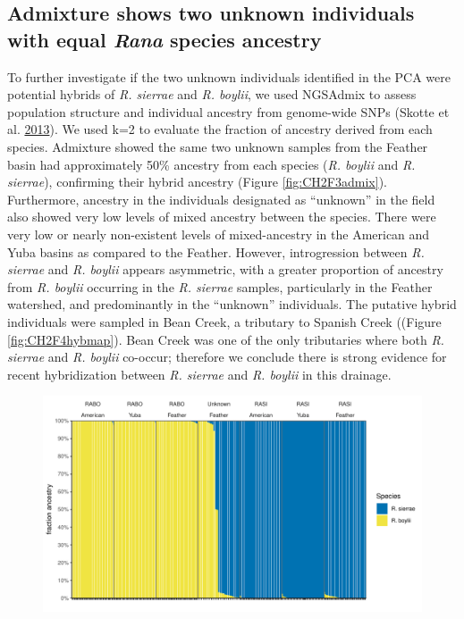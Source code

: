 \documentclass[proquest,12pt,final]{ucthesis-CA2012} %
\begin{document}
\begin{ucmainmatter}
\hypertarget{admixture-shows-two-unknown-individuals-with-equal-rana-species-ancestry}{%
\subsection{\texorpdfstring{Admixture shows two unknown individuals with
equal \emph{Rana} species
ancestry}{Admixture shows two unknown individuals with equal Rana species ancestry}}\label{admixture-shows-two-unknown-individuals-with-equal-rana-species-ancestry}}

To further investigate if the two unknown individuals identified in the
PCA were potential hybrids of \emph{R. sierrae} and \emph{R. boylii}, we
used NGSAdmix to assess population structure and individual ancestry
from genome-wide SNPs (Skotte et al.
\protect\hyperlink{ref-skotte_estimating_2013}{2013}). We used k=2 to
evaluate the fraction of ancestry derived from each species. Admixture
showed the same two unknown samples from the Feather basin had
approximately 50\% ancestry from each species (\emph{R. boylii} and
\emph{R. sierrae}), confirming their hybrid ancestry (Figure
\ref{fig:CH2F3admix}). Furthermore, ancestry in the individuals
designated as ``unknown'' in the field also showed very low levels of
mixed ancestry between the species. There were very low or nearly
non-existent levels of mixed-ancestry in the American and Yuba basins as
compared to the Feather. However, introgression between \emph{R.
sierrae} and \emph{R. boylii} appears asymmetric, with a greater
proportion of ancestry from \emph{R. boylii} occurring in the \emph{R.
sierrae} samples, particularly in the Feather watershed, and
predominantly in the ``unknown'' individuals. The putative hybrid
individuals were sampled in Bean Creek, a tributary to Spanish Creek
((Figure \ref{fig:CH2F4hybmap}). Bean Creek was one of the only
tributaries where both \emph{R. sierrae} and \emph{R. boylii} co-occur;
therefore we conclude there is strong evidence for recent hybridization
between \emph{R. sierrae} and \emph{R. boylii} in this drainage.




\begin{figure}

{\centering \includegraphics[width=1\linewidth]{figure/ch2/figure_03_admix_rana_by_watershed_25k_k2} 

}
\end{figure}
\end{ucmainmatter}
\end{document}
